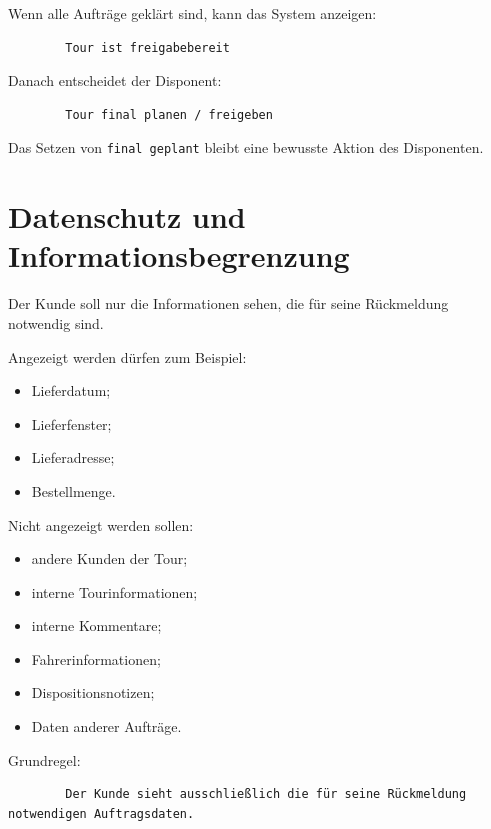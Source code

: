 \documentclass[12pt,a4paper]{article}
\begin{document}
	Wenn alle Aufträge geklärt sind, kann das System anzeigen:
	
	\begin{lstlisting}
		Tour ist freigabebereit
	\end{lstlisting}
	
	Danach entscheidet der Disponent:
	
	\begin{lstlisting}
		Tour final planen / freigeben
	\end{lstlisting}
	
	Das Setzen von \texttt{final geplant} bleibt eine bewusste Aktion des Disponenten.
	
	\section{Datenschutz und Informationsbegrenzung}
	
	Der Kunde soll nur die Informationen sehen, die für seine Rückmeldung notwendig sind.
	
	Angezeigt werden dürfen zum Beispiel:
	
	\begin{itemize}
		\item Lieferdatum;
		\item Lieferfenster;
		\item Lieferadresse;
		\item Bestellmenge.
	\end{itemize}
	
	Nicht angezeigt werden sollen:
	
	\begin{itemize}
		\item andere Kunden der Tour;
		\item interne Tourinformationen;
		\item interne Kommentare;
		\item Fahrerinformationen;
		\item Dispositionsnotizen;
		\item Daten anderer Aufträge.
	\end{itemize}
	
	Grundregel:
	
	\begin{lstlisting}
		Der Kunde sieht ausschließlich die für seine Rückmeldung notwendigen Auftragsdaten.
	\end{lstlisting}
	
\end{document}
